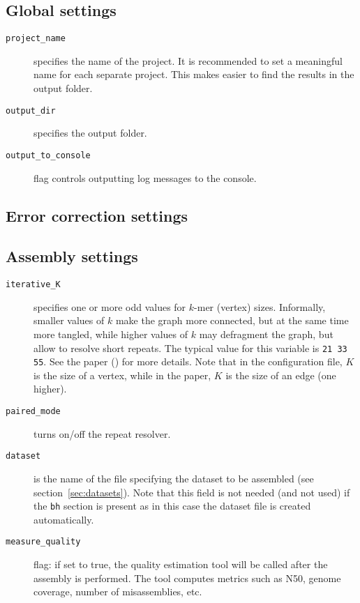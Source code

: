 \documentclass{article}
\begin{document}
\subsection{Global settings}
\begin{description}
\item[{\tt project\_name}] specifies the name of the project. It is recommended to set a meaningful name for each separate project. This makes easier to find the results in the output folder.
\item[{\tt output\_dir}] specifies the output folder.
\item[{\tt output\_to\_console}] flag controls outputting log messages to the console.
\end{description}


\subsection{Error correction settings}

\subsection{Assembly settings}
\begin{description}
\item[{\tt iterative\_K}] specifies one or more odd values for $k$-mer (vertex) sizes.  Informally, smaller values of $k$ make the graph more connected, but at the same time more tangled, while higher values of $k$ may defragment the graph, but allow to resolve short repeats. The typical value for this variable is {\tt 21 33 55}. See the paper (\cite{main}) for more details.  Note that in the configuration file, $K$ is the size of a vertex, while in the paper, $K$ is the size of an edge (one higher).

\item[{\tt paired\_mode}] turns on/off the repeat resolver.

\item[{\tt dataset}] is the name of the file specifying the dataset to be assembled
(see section~\ref{sec:datasets}). Note that this field is not needed (and not used)
if the {\tt bh} section is present as in this case the dataset file is created automatically.

\item[{\tt measure\_quality}] flag: if set to true, the quality estimation tool will be called after the assembly is performed.  The tool computes metrics such as N50, genome coverage, number of misassemblies, etc.
\end{description}
\end{document}
